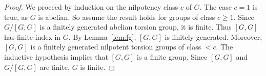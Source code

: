 \begin{proof}
We proceed by induction on the nilpotency class $c$ of $G$. The case
$c=1$ is true, as $G$ is abelian. So assume the result holds for 
groups of class $c\geq1$. Since $G/[G,G]$ is a finitely generated abelian torsion group, 
it is finite. Thus $[G,G]$ has finite index in $G$. By Lemma~\ref{lem:fg}, 
$[G,G]$ is finitely generated. Moreover, $[G,G]$ is a finitely generated 
nilpotent torsion groups of class  $<c$.  
The inductive hypothesis implies that
$[G,G]$ is a finite group. Since $[G,G]$ and $G/[G,G]$ are finite, 
$G$ is finite. %
\end{proof}

%
%
%



